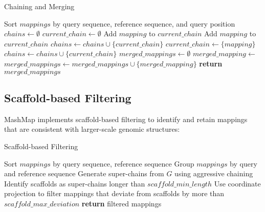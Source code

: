 \documentclass{article}
\begin{document}
\begin{algorithm}
\caption{Chaining and Merging}
\begin{algorithmic}[1]
\State Sort $mappings$ by query sequence, reference sequence, and query position
\State $chains \gets \emptyset$
\State $current\_chain \gets \emptyset$
        \State Add $mapping$ to $current\_chain$
        \State Add $mapping$ to $current\_chain$
    \Else
        \State $chains \gets chains \cup \{current\_chain\}$
        \State $current\_chain \gets \{mapping\}$
    \EndIf
\EndFor
{}
    \State $chains \gets chains \cup \{current\_chain\}$
\EndIf
\State $merged\_mappings \gets \emptyset$
    \State $merged\_mapping \gets$ 
    \State $merged\_mappings \gets merged\_mappings \cup \{merged\_mapping\}$
\EndFor
\State \textbf{return} $merged\_mappings$
\EndProcedure
\end{algorithmic}
\end{algorithm}

\subsection{Scaffold-based Filtering}

MashMap implements scaffold-based filtering to identify and retain mappings that are consistent with larger-scale genomic structures:

\begin{algorithm}
\caption{Scaffold-based Filtering}
\begin{algorithmic}[1]
\State Sort $mappings$ by query sequence, reference sequence
\State Group $mappings$ by query and reference sequence
    \State Generate super-chains from $G$ using aggressive chaining
    \State Identify scaffolds as super-chains longer than $scaffold\_min\_length$
    \State Use coordinate projection to filter mappings that deviate from scaffolds by more than $scaffold\_max\_deviation$
\EndFor
\State \textbf{return} filtered mappings
\EndProcedure
\end{algorithmic}
\end{algorithm}
\end{document}

